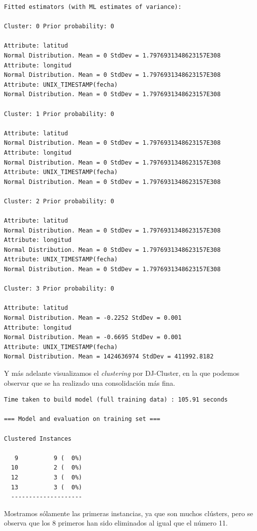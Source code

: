 \documentclass[a4paper, 12pt]{article}
\begin{document}
\begin{verbatim}
Fitted estimators (with ML estimates of variance):

Cluster: 0 Prior probability: 0

Attribute: latitud
Normal Distribution. Mean = 0 StdDev = 1.7976931348623157E308
Attribute: longitud
Normal Distribution. Mean = 0 StdDev = 1.7976931348623157E308
Attribute: UNIX_TIMESTAMP(fecha)
Normal Distribution. Mean = 0 StdDev = 1.7976931348623157E308

Cluster: 1 Prior probability: 0

Attribute: latitud
Normal Distribution. Mean = 0 StdDev = 1.7976931348623157E308
Attribute: longitud
Normal Distribution. Mean = 0 StdDev = 1.7976931348623157E308
Attribute: UNIX_TIMESTAMP(fecha)
Normal Distribution. Mean = 0 StdDev = 1.7976931348623157E308

Cluster: 2 Prior probability: 0

Attribute: latitud
Normal Distribution. Mean = 0 StdDev = 1.7976931348623157E308
Attribute: longitud
Normal Distribution. Mean = 0 StdDev = 1.7976931348623157E308
Attribute: UNIX_TIMESTAMP(fecha)
Normal Distribution. Mean = 0 StdDev = 1.7976931348623157E308

Cluster: 3 Prior probability: 0

Attribute: latitud
Normal Distribution. Mean = -0.2252 StdDev = 0.001
Attribute: longitud
Normal Distribution. Mean = -0.6695 StdDev = 0.001
Attribute: UNIX_TIMESTAMP(fecha)
Normal Distribution. Mean = 1424636974 StdDev = 411992.8182

\end{verbatim}

Y m\'as adelante visualizamos el \textit{clustering} por DJ-Cluster, en la que podemos observar que se ha realizado una consolidaci\'on m\'as fina.

\begin{verbatim}
Time taken to build model (full training data) : 105.91 seconds

=== Model and evaluation on training set ===

Clustered Instances

   9          9 (  0%)
  10          2 (  0%)
  12          3 (  0%)
  13          3 (  0%)
  --------------------
\end{verbatim}

Mostramos s\'olamente las primeras instancias, ya que son muchos cl\'usters, pero se observa que los 8 primeros han sido eliminados al igual que el n\'umero 11.
\end{document}
